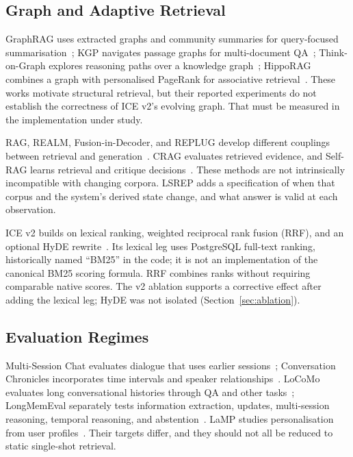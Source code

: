 \documentclass[twoside,11pt]{article}
\begin{document}
\subsection{Graph and Adaptive Retrieval}
\label{sec:related-kg}\label{sec:related-rag}\label{sec:related-primitives}
GraphRAG uses extracted graphs and community summaries for query-focused summarisation~\citep{edge2024graphrag}; KGP navigates passage graphs for multi-document QA~\citep{wang2023kgp}; Think-on-Graph explores reasoning paths over a knowledge graph~\citep{sun2024tog}; HippoRAG combines a graph with personalised PageRank for associative retrieval~\citep{gutierrez2024hipporag}. These works motivate structural retrieval, but their reported experiments do not establish the correctness of ICE v2's evolving graph. That must be measured in the implementation under study.

RAG, REALM, Fusion-in-Decoder, and REPLUG develop different couplings between retrieval and generation~\citep{lewis2020rag,guu2020realm,izacard2021fid,shi2024replug}. CRAG evaluates retrieved evidence, and Self-RAG learns retrieval and critique decisions~\citep{yan2024crag,asai2024selfrag}. These methods are not intrinsically incompatible with changing corpora. LSREP adds a specification of when that corpus and the system's derived state change, and what answer is valid at each observation.

ICE v2 builds on lexical ranking, weighted reciprocal rank fusion (RRF), and an optional HyDE rewrite~\citep{robertson2009bm25,cormack2009rrf,gao2023hyde}. Its lexical leg uses PostgreSQL full-text ranking, historically named ``BM25'' in the code; it is not an implementation of the canonical BM25 scoring formula. RRF combines ranks without requiring comparable native scores. The v2 ablation supports a corrective effect after adding the lexical leg; HyDE was not isolated (Section~\ref{sec:ablation}).

\subsection{Evaluation Regimes}
\label{sec:related-eval}
Multi-Session Chat evaluates dialogue that uses earlier sessions~\citep{xu2022msc}; Conversation Chronicles incorporates time intervals and speaker relationships~\citep{jang2023chronicles}. LoCoMo evaluates long conversational histories through QA and other tasks~\citep{maharana2024locomo}; LongMemEval separately tests information extraction, updates, multi-session reasoning, temporal reasoning, and abstention~\citep{wu2025longmemeval}. LaMP studies personalisation from user profiles~\citep{salemi2024lamp}. Their targets differ, and they should not all be reduced to static single-shot retrieval.
\end{document}
